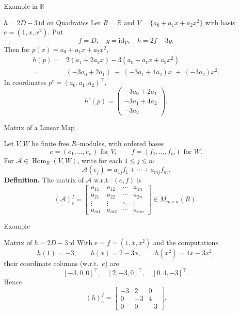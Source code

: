 \documentclass[11pt,aspectratio=43,ignorenonframetext,t]{beamer}
\begin{document}
\begin{frame}{Example in $\mathbb{R}$}
\vspace{-0.3cm}
\begin{block}{$h=2D-3\,\mathrm{id}$ on Quadratics}
    Let $R=\mathbb{R}$ and $V=\{a_0+a_1 x+a_2 x^2\}$ with basis $e=(1,x,x^2)$. Put
\[
f=D,\quad g=\mathrm{id}_V,\quad h=2f-3g.
\]
Then for $p(x)=a_0+a_1 x+a_2 x^2$,
\begin{align*}
h(p)=&2(a_1+2a_2 x)-3(a_0+a_1 x+a_2 x^2)\\
=&(-3a_0+2a_1)\;+\;(-3a_1+4a_2)x\;+\;(-3a_2)x^2.    
\end{align*}
In coordinates $p^e=(a_0,a_1,a_2)^\top$,
\[
h^e(p)=\begin{pmatrix}-3a_0+2a_1\\ -3a_1+4a_2\\ -3a_2\end{pmatrix}.
\]
\end{block}
\end{frame}


\begin{frame}{Matrix of a Linear Map}
\begin{block}{}
    Let $V,W$ be finite free $R$–modules, with ordered bases
\[
e=(e_1,\dots,e_n) \text{ for } V,\qquad f=(f_1,\dots,f_m) \text{ for } W.
\]
For $\mathcal{A}\in\operatorname{Hom}_R(V,W)$, write for each $1\le j\le n$:
\[
\mathcal{A}(e_j)=a_{1j}f_1+\cdots+a_{mj}f_m.
\]
\textbf{Definition.} The matrix of $\mathcal{A}$ w.r.t.\ $(e,f)$ is
\[
(\mathcal{A})_e^f =
\begin{bmatrix}
a_{11} & a_{12} & \cdots & a_{1n}\\
a_{21} & a_{22} & \cdots & a_{2n}\\
\vdots & \vdots & \ddots & \vdots\\
a_{m1} & a_{m2} & \cdots & a_{mn}
\end{bmatrix}\in M_{m\times n}(R).
\]
\end{block}
\end{frame}

\begin{frame}{Example}
\begin{block}{Matrix of $h=2D-3\,\mathrm{id}$}
    With $e=f=(1,x,x^2)$ and the computations
\[
h(1)=-3,\qquad h(x)=2-3x,\qquad h(x^2)=4x-3x^2,
\]
their coordinate columns (w.r.t.\ $e$) are
\[
[-3,0,0]^\top,\quad [2,-3,0]^\top,\quad [0,4,-3]^\top.
\]
Hence
\[
(h)_e^f=
\begin{bmatrix}
-3 & 2 & 0\\
0  & -3 & 4\\
0  & 0  & -3
\end{bmatrix}.
\]
\end{block}

\end{frame}
\end{document}
